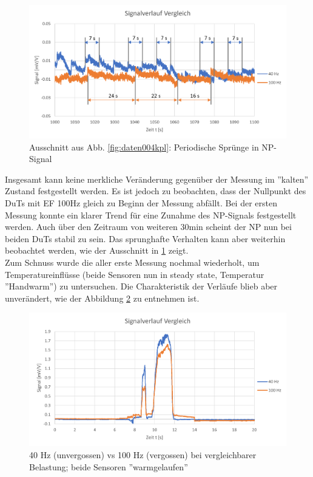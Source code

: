 \documentclass[12pt,a4paper]{article}
\begin{document}
\begin{figure}[H]
	\centering
	\includegraphics[width=1\linewidth]{imgs/daten_004_detail}
	\caption{Ausschnitt aus Abb. \ref{fig:daten004kpl}: Periodische Sprünge in NP-Signal}
	\label{fig:daten004detail}
\end{figure}\noindent
Insgesamt kann keine merkliche Veränderung gegenüber der Messung im ''kalten'' Zustand festgestellt werden. Es ist jedoch zu beobachten, dass der Nullpunkt des DuTs mit EF 100Hz gleich zu Beginn der Messung abfällt. Bei der ersten Messung konnte ein klarer Trend für eine Zunahme des NP-Signals festgestellt werden. Auch über den Zeitraum von weiteren 30min scheint der NP nun bei beiden DuTs stabil zu sein. Das sprunghafte Verhalten kann aber weiterhin beobachtet werden, wie der Ausschnitt in \ref{fig:daten004detail} zeigt.\\
Zum Schnuss wurde die aller erste Messung nochmal wiederholt, um Temperatureinflüsse (beide Sensoren nun in steady state, Temperatur ''Handwarm'') zu untersuchen. Die Charakteristik der Verläufe blieb aber unverändert, wie der Abbildung \ref{fig:daten006kpl} zu entnehmen ist. 
\begin{figure}[H]
	\centering
	\includegraphics[width=1\linewidth]{imgs/daten_006_kpl}
	\caption{40 Hz (unvergossen) vs 100 Hz (vergossen) bei vergleichbarer Belastung; beide Sensoren ''warmgelaufen''}
	\label{fig:daten006kpl}
\end{figure}\noindent
\end{document}

